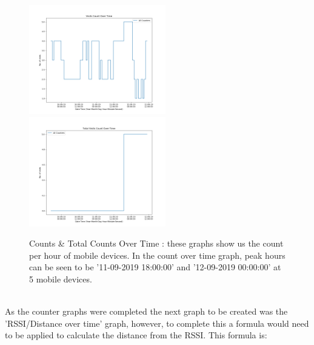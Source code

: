 \documentclass{report}
\begin{document}
\begin{figure}[h!]
    \centering
    \includegraphics[width=225]{count_over_time.png}
    \includegraphics[width=225]{total_count_over_time.png}
    \caption{Counts & Total Counts Over Time : these graphs show us the count per hour of mobile devices. In the count over time graph, peak hours can be seen to be '11-09-2019 18:00:00' and '12-09-2019 00:00:00' at 5 mobile devices. }
    \label{fig:CountOverTime}
\end{figure}{} \\
As the counter graphs were completed the next graph to be created was the 'RSSI/Distance over time' graph, however, to complete this a formula would need to be applied to calculate the distance from the RSSI. This formula is:\cite{RSSItoDistance} \\
\end{document}
